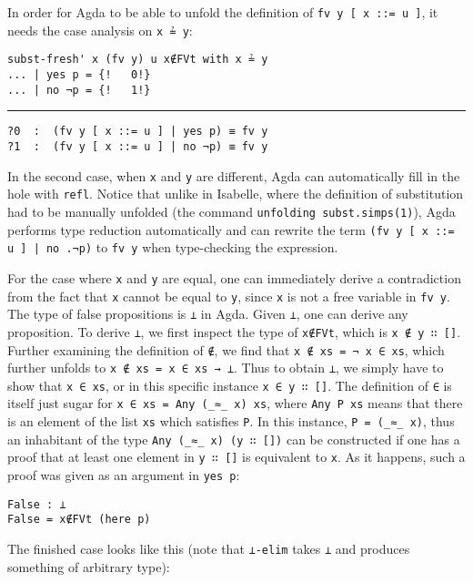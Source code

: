 \documentclass[a4paper, 12pt, twoside]{style/ociamthesis}
\theoremstyle{plain}
\theoremstyle{definition}
\theoremstyle{remark}
\begin{document}
In order for Agda to be able to unfold the definition of
\texttt{fv y [ x ::= u ]}, it needs the case analysis on \texttt{x ≟ y}:

\begin{verbatim}
subst-fresh' x (fv y) u x∉FVt with x ≟ y
... | yes p = {!   0!}
... | no ¬p = {!   1!}
\end{verbatim}

\noindent\rule{8cm}{0.4pt}

\begin{verbatim}
?0  :  (fv y [ x ::= u ] | yes p) ≡ fv y
?1  :  (fv y [ x ::= u ] | no ¬p) ≡ fv y
\end{verbatim}

In the second case, when \texttt{x} and \texttt{y} are different, Agda
can automatically fill in the hole with \texttt{refl}. Notice that
unlike in Isabelle, where the definition of substitution had to be
manually unfolded (the command \texttt{unfolding subst.simps(1)}), Agda
performs type reduction automatically and can rewrite the term
\texttt{(fv y [ x ::= u ] | no .¬p)} to \texttt{fv y} when type-checking
the expression.

For the case where \texttt{x} and \texttt{y} are equal, one can
immediately derive a contradiction from the fact that \texttt{x} cannot
be equal to \texttt{y}, since \texttt{x} is not a free variable in
\texttt{fv y}. The type of false propositions is \texttt{⊥} in Agda.
Given \texttt{⊥}, one can derive any proposition. To derive \texttt{⊥},
we first inspect the type of \texttt{x∉FVt}, which is
\texttt{x ∉ y ∷ []}. Further examining the definition of \texttt{∉}, we
find that \texttt{x ∉ xs = ¬ x ∈ xs}, which further unfolds to
\texttt{x ∉ xs = x ∈ xs → ⊥}. Thus to obtain \texttt{⊥}, we simply have
to show that \texttt{x ∈ xs}, or in this specific instance
\texttt{x ∈ y ∷ []}. The definition of \texttt{∈} is itself just sugar
for \texttt{x ∈ xs = Any (\_≈\_ x) xs}, where \texttt{Any P xs} means
that there is an element of the list \texttt{xs} which satisfies
\texttt{P}. In this instance, \texttt{P = (\_≈\_ x)}, thus an inhabitant
of the type \texttt{Any (\_≈\_ x) (y ∷ [])} can be constructed if one
has a proof that at least one element in \texttt{y ∷ []} is equivalent
to \texttt{x}. As it happens, such a proof was given as an argument in
\texttt{yes p}:

\begin{verbatim}
False : ⊥
False = x∉FVt (here p)
\end{verbatim}

The finished case looks like this (note that \texttt{⊥-elim} takes
\texttt{⊥} and produces something of arbitrary type):
\end{document}
